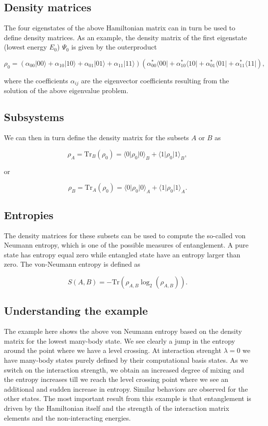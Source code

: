 \documentclass[%
oneside,                 %
final,                   %
10pt]{article}
\begin{document}
\subsection{Density matrices}

The four eigenstates of the above Hamiltonian matrix can in turn be used to
define density matrices. As an example, the density matrix of the
first eigenstate (lowest energy $E_0$) $\Psi_0$ is given by the outerproduct

\[
\rho_0=\left(\alpha_{00}\vert 00 \rangle+\alpha_{10}\vert 10 \rangle+\alpha_{01}\vert 01 \rangle+\alpha_{11}\vert 11 \rangle\right)\left(\alpha_{00}^*\langle 00\vert+\alpha_{10}^*\langle 10\vert+\alpha_{01}^*\langle 01\vert+\alpha_{11}^*\langle 11\vert\right),
\]

where the coefficients $\alpha_{ij}$ are the eigenvector coefficients
resulting from the solution of the above eigenvalue problem. 

\subsection{Subsystems}

We can
then in turn define the density matrix for the subsets $A$ or $B$ as

\[
\rho_A=\mathrm{Tr}_B(\rho_{0})=\langle 0 \vert \rho_{0} \vert 0\rangle_{B}+\langle 1 \vert \rho_{0} \vert 1\rangle_{B},
\]

or

\[
\rho_B=\mathrm{Tr}_A(\rho_0)=\langle 0 \vert \rho_{0} \vert 0\rangle_{A}+\langle 1 \vert \rho_{0} \vert 1\rangle_{A}.
\]

\subsection{Entropies}

The density matrices for these subsets can be used to compute the
so-called von Neumann entropy, which is one of the possible measures
of entanglement. A pure state has entropy equal zero while entangled
state have an entropy larger than zero. The von-Neumann entropy is
defined as

\[
S(A,B)=-\mathrm{Tr}\left(\rho_{A,B}\log_2 (\rho_{A,B})\right).
\]

\subsection{Understanding the example}
The example here shows the above von Neumann entropy based on the
density matrix for the lowest many-body state. We see clearly a jump
in the entropy around the point where we have a level crossing. At
interaction strenght $\lambda=0$ we have many-body states purely
defined by their computational basis states. As we switch on the
interaction strength, we obtain an increased degree of mixing and the
entropy increases till we reach the level crossing point where we see
an additional and sudden increase in entropy. Similar behaviors are
observed for the other states. The most important result from this
example is that entanglement is driven by the Hamiltonian itself and
the strength of the interaction matrix elements and the
non-interacting energies.
\end{document}
